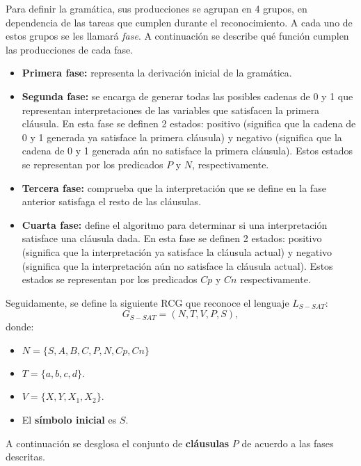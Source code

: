 \documentclass{article}
\begin{document}
Para definir la gramática, sus producciones se agrupan en 4 grupos, en dependencia de las tareas que cumplen durante el reconocimiento. A cada uno de estos grupos se les llamará \textit{fase}. A continuación se describe qué función cumplen las producciones de cada fase.

\begin{itemize}
    \item \textbf{Primera fase:} representa la derivación inicial de la gramática.
    \item \textbf{Segunda fase:} se encarga de generar todas las posibles cadenas de 0 y 1 que representan interpretaciones de las variables que satisfacen la primera cláusula. En esta fase se definen 2 estados: positivo (significa que la cadena de 0 y 1 generada ya satisface la primera cláusula) y negativo (significa que la cadena de 0 y 1 generada aún no satisface la primera cláusula). Estos estados se representan por los predicados $P$ y $N$, respectivamente.
    \item \textbf{Tercera fase:} comprueba que la interpretación que se define en la fase anterior satisfaga el resto de las cláusulas.
    \item \textbf{Cuarta fase:} define el algoritmo para determinar si una interpretación satisface una cláusula dada. En esta fase se definen 2 estados: positivo (significa que la interpretación ya satisface la cláusula actual) y negativo (significa que la interpretación aún no satisface la cláusula actual). Estos estados se representan por los predicados $Cp$ y $Cn$ respectivamente.
\end{itemize}

Seguidamente, se define la siguiente RCG que reconoce el lenguaje $L_{S-SAT}$:
\[
    G_{S-SAT} = (N, T, V, P, S),
\]
donde:

\begin{itemize}
    \item $N=\{S,A,B,C,P,N,Cp,Cn\}$
    \item $T=\{a,b,c,d\}$.
    \item $V=\{X,Y,X_1,X_2\}$.
    \item El \textbf{símbolo inicial} es $S$.
\end{itemize}

A continuación se desglosa el conjunto de \textbf{cláusulas} $P$ de acuerdo a las fases descritas.
\end{document}

